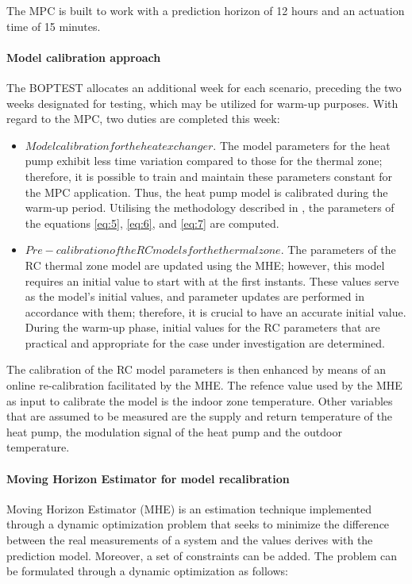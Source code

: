 The MPC is built to work with a prediction horizon of 12 hours and an actuation time of 15 minutes.

\paragraph{Model calibration approach}
The BOPTEST allocates an additional week for each scenario, preceding the two weeks designated for testing, which may be utilized for warm-up purposes. With regard to the MPC, two duties are completed this week:
\begin{itemize}
  \item $Model calibration for the heat exchanger$. The model parameters for the heat pump exhibit less time variation compared to those for the thermal zone; therefore, it is possible to train and maintain these parameters constant for the MPC application. Thus, the heat pump model is calibrated during the warm-up period. Utilising the methodology described in \cite{Monfet2013}, the parameters of the equations \ref{eq:5}, \ref{eq:6}, and \ref{eq:7} are computed. 
  \item $Pre-calibration of the RC models for the thermal zone$. The parameters of the RC thermal zone model are updated using the MHE; however, this model requires an initial value to start with at the first instants. These values serve as the model's initial values, and parameter updates are performed in accordance with them; therefore, it is crucial to have an accurate initial value. During the warm-up phase, initial values for the RC parameters that are practical and appropriate for the case under investigation are determined.
\end{itemize}

The calibration of the RC model parameters is then enhanced by means of an online re-calibration facilitated by the MHE.
The refence value used by the MHE as input to calibrate the model is the indoor zone temperature. Other variables that are assumed to be measured are the supply and return temperature of the heat pump, the modulation signal of the heat pump and the outdoor temperature.

\paragraph{Moving Horizon Estimator for model recalibration} Moving Horizon Estimator (MHE) is an estimation technique implemented through a dynamic optimization problem that seeks to minimize the difference between the real measurements of a system and the values derives with the prediction model. Moreover, a set of constraints can be added. The problem can be formulated through a dynamic optimization as follows:

